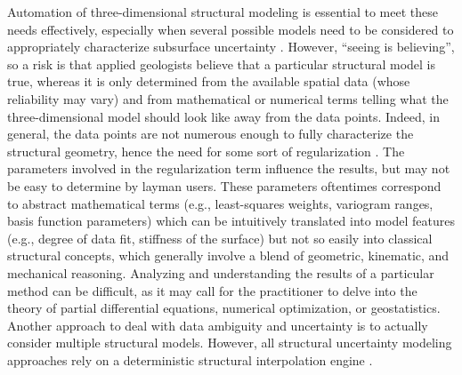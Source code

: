 \documentclass[final]{ring20}
\begin{document}
Automation of three-dimensional structural modeling is essential to meet these needs effectively, especially when several possible models need to be considered to appropriately characterize subsurface uncertainty \citep{Wellmann2018AiG}. However, ``seeing is believing'', so a risk is that applied geologists believe that a particular structural model is true, whereas it is only determined from the available spatial data (whose reliability may vary) and from mathematical or numerical terms telling what the three-dimensional model should look like away from the data points. Indeed, in general, the data points are not numerous enough to fully characterize the structural geometry, hence the need for some sort of regularization \citep[e.g.,][]{Renaudeau2019MG}. The parameters involved in the regularization term influence the results, but may not be easy to determine by layman users. These parameters oftentimes correspond to abstract mathematical terms (e.g., least-squares weights, variogram ranges, basis function parameters) which can be intuitively translated into model features (e.g., degree of data fit, stiffness of the surface) but not so easily into classical structural concepts, which generally involve a blend of geometric, kinematic, and mechanical reasoning. Analyzing and understanding the results of a particular method can be difficult, as it may call for the practitioner to delve into the theory of partial differential equations, numerical optimization, or geostatistics. Another approach to deal with data ambiguity and uncertainty is to actually consider multiple structural models. However, all structural uncertainty modeling approaches rely on a deterministic structural interpolation engine \citep[see ][ and references therein]{Wellmann2018AiG}.
\end{document}
